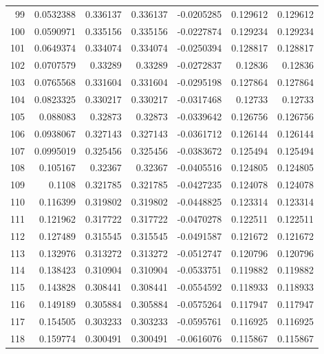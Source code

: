 \begin{tabular}{rrrrrrr}
  99 &  0.0532388   & 0.336137    & 0.336137    & -0.0205285   & 0.129612    & 0.129612    \\
 100 &  0.0590971   & 0.335156    & 0.335156    & -0.0227874   & 0.129234    & 0.129234    \\
 101 &  0.0649374   & 0.334074    & 0.334074    & -0.0250394   & 0.128817    & 0.128817    \\
 102 &  0.0707579   & 0.33289     & 0.33289     & -0.0272837   & 0.12836     & 0.12836     \\
 103 &  0.0765568   & 0.331604    & 0.331604    & -0.0295198   & 0.127864    & 0.127864    \\
 104 &  0.0823325   & 0.330217    & 0.330217    & -0.0317468   & 0.12733     & 0.12733     \\
 105 &  0.088083    & 0.32873     & 0.32873     & -0.0339642   & 0.126756    & 0.126756    \\
 106 &  0.0938067   & 0.327143    & 0.327143    & -0.0361712   & 0.126144    & 0.126144    \\
 107 &  0.0995019   & 0.325456    & 0.325456    & -0.0383672   & 0.125494    & 0.125494    \\
 108 &  0.105167    & 0.32367     & 0.32367     & -0.0405516   & 0.124805    & 0.124805    \\
 109 &  0.1108      & 0.321785    & 0.321785    & -0.0427235   & 0.124078    & 0.124078    \\
 110 &  0.116399    & 0.319802    & 0.319802    & -0.0448825   & 0.123314    & 0.123314    \\
 111 &  0.121962    & 0.317722    & 0.317722    & -0.0470278   & 0.122511    & 0.122511    \\
 112 &  0.127489    & 0.315545    & 0.315545    & -0.0491587   & 0.121672    & 0.121672    \\
 113 &  0.132976    & 0.313272    & 0.313272    & -0.0512747   & 0.120796    & 0.120796    \\
 114 &  0.138423    & 0.310904    & 0.310904    & -0.0533751   & 0.119882    & 0.119882    \\
 115 &  0.143828    & 0.308441    & 0.308441    & -0.0554592   & 0.118933    & 0.118933    \\
 116 &  0.149189    & 0.305884    & 0.305884    & -0.0575264   & 0.117947    & 0.117947    \\
 117 &  0.154505    & 0.303233    & 0.303233    & -0.0595761   & 0.116925    & 0.116925    \\
 118 &  0.159774    & 0.300491    & 0.300491    & -0.0616076   & 0.115867    & 0.115867    \\

\end{tabular}
